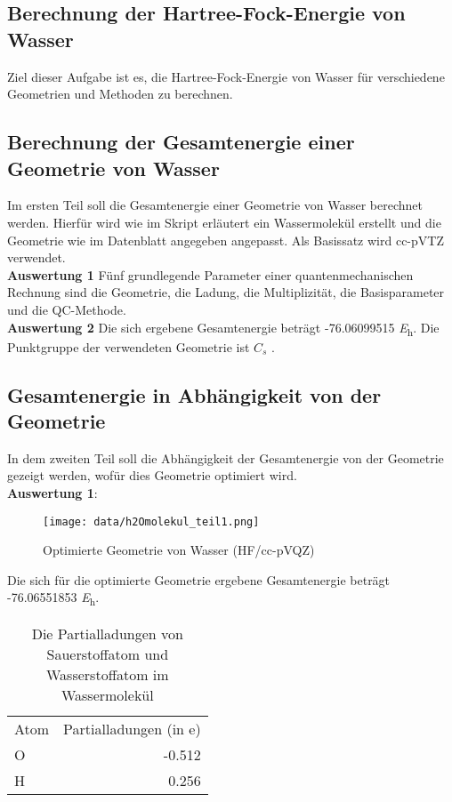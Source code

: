 \documentclass[12pt]{article}
\begin{document}
\tableofcontents

\begin{onehalfspace}


\section{Berechnung der Hartree-Fock-Energie von Wasser}
Ziel dieser Aufgabe ist es, die Hartree-Fock-Energie von Wasser für verschiedene Geometrien und Methoden zu berechnen.
\subsection{Berechnung der Gesamtenergie einer Geometrie von Wasser}
Im ersten Teil soll die Gesamtenergie einer Geometrie von Wasser berechnet werden. Hierfür wird wie im Skript erläutert ein Wassermolekül erstellt und die Geometrie wie im Datenblatt angegeben angepasst. Als Basissatz wird cc-pVTZ verwendet. \\
\textbf{Auswertung 1} Fünf grundlegende Parameter einer quantenmechanischen Rechnung sind die Geometrie, die Ladung, die Multiplizität, die Basisparameter und die QC-Methode. \\
\textbf{Auswertung 2} Die sich ergebene Gesamtenergie beträgt -76.06099515 \si{\hartree}.
Die Punktgruppe der verwendeten Geometrie ist $C _s$ .\\
\subsection{Gesamtenergie in Abhängigkeit von der Geometrie}
In dem zweiten Teil soll die Abhängigkeit der Gesamtenergie von der Geometrie gezeigt werden, wofür dies Geometrie optimiert wird.\\
\textbf{Auswertung 1}:\\
\begin{figure}[!htbp]
\centering
\texttt{[image: data/h2Omolekul\_teil1.png]}
  \caption{Optimierte Geometrie von Wasser (HF/cc-pVQZ)}
\end{figure}
\noindent
Die sich für die optimierte Geometrie ergebene Gesamtenergie beträgt -76.06551853 \si{\hartree}. \\
\begin{table}[htbp]
\centering
\caption{Die Partialladungen von Sauerstoffatom und Wasserstoffatom im Wassermolekül}
\begin{tabular}{lr}
\toprule
Atom &  Partialladungen (in e)\\
O & -0.512\\
H & 0.256\\
\midrule
\bottomrule


\end{tabular}
\end{table}
\end{onehalfspace}
\end{document}
